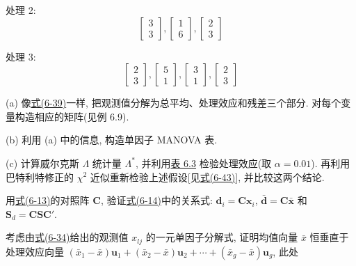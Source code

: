 处理 2:
\[
\begin{bmatrix}3\\3\end{bmatrix},\begin{bmatrix}1\\6\end{bmatrix},\begin{bmatrix}2\\3\end{bmatrix}
\]

处理 3:
\[
\begin{bmatrix}2\\3\end{bmatrix},\begin{bmatrix}5\\1\end{bmatrix},\begin{bmatrix}3\\1\end{bmatrix},\begin{bmatrix}2\\3\end{bmatrix}
\]

\noindent (a) 像\hyperref[eq:6-39]{式(6-39)}一样, 把观测值分解为总平均、处理效应和残差三个部分. 对每个变量构造相应的矩阵(见例 6.9).

\noindent (b) 利用 (a) 中的信息, 构造单因子 MANOVA 表.

\noindent (c) 计算威尔克斯 $\Lambda$ 统计量 $\Lambda^*$, 并利用\hyperref[tab:6.3]{表 6.3} 检验处理效应(取 $\alpha=0.01$). 再利用巴特利特修正的 $\chi^2$ 近似重新检验上述假设[见\hyperref[eq:6-43]{式(6-43)}], 并比较这两个结论.

\quad 用\hyperref[eq:6-13]{式(6-13)}的对照阵 $\mathbf{C}$, 验证\hyperref[eq:6-14]{式(6-14)}中的关系式: $\mathbf{d}_i=\mathbf{C}\mathbf{x}_i$, $\bar{\mathbf{d}}=\mathbf{C}\bar{\mathbf{x}}$ 和 $\mathbf{S}_d=\mathbf{C}\mathbf{S}\mathbf{C}'$.

\quad 考虑由\hyperref[eq:6-34]{式(6-34)}给出的观测值 $x_{lj}$ 的一元单因子分解式, 证明均值向量 $\bar{x}$ 恒垂直于处理效应向量 $(\bar{x}_1-\bar{x})\mathbf{u}_1+(\bar{x}_2-\bar{x})\mathbf{u}_2+\cdots+(\bar{x}_g-\bar{x})\mathbf{u}_g$, 此处

